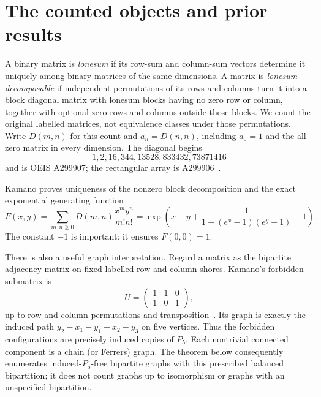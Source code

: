 \documentclass[11pt]{article}
\theoremstyle{remark}\newtheorem{remark}{Remark}
\begin{document}
\section{The counted objects and prior results}
A binary matrix is \emph{lonesum} if its row-sum and column-sum vectors determine it uniquely among binary matrices of the same dimensions. A matrix is \emph{lonesum decomposable} if independent permutations of its rows and columns turn it into a block diagonal matrix with lonesum blocks having no zero row or column, together with optional zero rows and columns outside those blocks. We count the original labelled matrices, not equivalence classes under those permutations. Write $D(m,n)$ for this count and $a_n=D(n,n)$, including $a_0=1$ and the all-zero matrix in every dimension. The diagonal begins
\[
1,2,16,344,13528,833432,73871416
\]
and is OEIS A299907; the rectangular array is A299906~\cite{OEIS,OEISrect}.

Kamano proves uniqueness of the nonzero block decomposition and the exact exponential generating function~\cite[Proposition 1.2; Theorem 3.1, equation (9)]{Kamano}
\begin{equation}\label{lsd:eq:egf}
 F(x,y)=\sum_{m,n\geq0}D(m,n)\frac{x^my^n}{m!n!}
 =\exp\left(x+y+\frac{1}{1-(e^x-1)(e^y-1)}-1\right).
\end{equation}
The constant $-1$ is important: it ensures $F(0,0)=1$.

There is also a useful graph interpretation. Regard a matrix as the bipartite adjacency matrix on fixed labelled row and column shores. Kamano's forbidden submatrix is
\[
 U=\begin{pmatrix}1&1&0\\1&0&1\end{pmatrix},
\]
up to row and column permutations and transposition~\cite[Theorem 2.1]{Kamano}. Its graph is exactly the induced path
$y_2-x_1-y_1-x_2-y_3$ on five vertices. Thus the forbidden configurations are precisely induced copies of $P_5$. Each nontrivial connected component is a chain (or Ferrers) graph. The theorem below consequently enumerates induced-$P_5$-free bipartite graphs with this prescribed balanced bipartition; it does not count graphs up to isomorphism or graphs with an unspecified bipartition.
\end{document}
